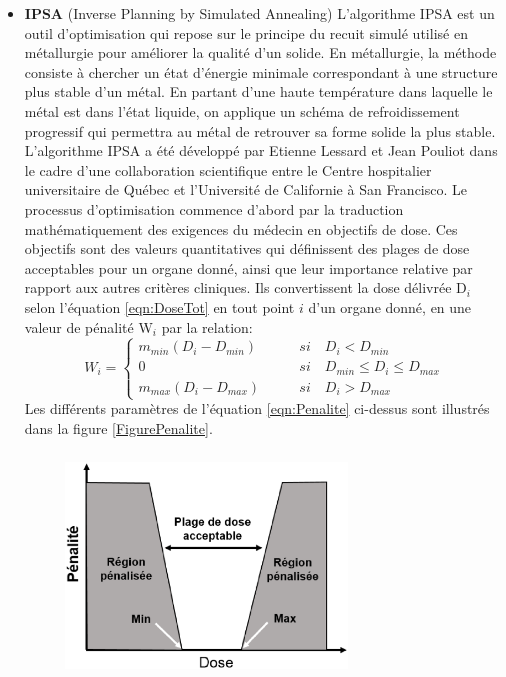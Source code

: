 \begin{itemize}[leftmargin=0pt, label=\textbullet, font=\LARGE]
\item[] \textbf{IPSA} (Inverse Planning by Simulated Annealing) \newline
L’algorithme IPSA est un outil d’optimisation qui repose sur le principe du recuit simulé utilisé en métallurgie pour améliorer la qualité d’un solide. En métallurgie, la méthode consiste à chercher un état d’énergie minimale correspondant à une structure plus stable d’un métal. En partant d’une haute température dans laquelle le métal est dans l’état liquide, on applique un schéma de refroidissement progressif qui permettra au métal de retrouver sa forme solide la plus stable. L’algorithme IPSA a été développé par Etienne Lessard et Jean Pouliot \cite{ELessard, lessard@2001} dans le cadre d’une collaboration scientifique entre le Centre hospitalier universitaire de Québec et l’Université de Californie à San Francisco. Le processus d’optimisation commence d’abord par la traduction mathématiquement des exigences du médecin en objectifs de dose. Ces objectifs sont des valeurs quantitatives qui définissent des plages de dose acceptables pour un organe donné, ainsi que leur importance relative par rapport aux autres critères cliniques. Ils convertissent la dose délivrée D$_{i}$ selon l’équation \eqref{eqn:DoseTot} en tout point $i$ d’un organe donné, en une valeur de pénalité W$_{i}$ par la relation:
%
\begin{equation}\label{eqn:Penalite}
    W_{i} = \begin{cases}
               m_{min}\left(D_{i}-D_{min}\right)               & \qquad si \quad D_{i} < D_{min} \\
               0                                               & \qquad si \quad D_{min} ≤ D_{i} ≤ D_{max} \\	
               m_{max}\left(D_{i}-D_{max}\right) 			   & \qquad si \quad D_{i} > D_{max} 
           \end{cases}
\end{equation}
%
Les différents paramètres de l'équation \eqref{eqn:Penalite} ci-dessus sont illustrés dans la figure \ref{FigurePenalite}. 
%
\begin{figure}[!ht]
\centering
\includegraphics[width=7.5cm, height=6.0cm]{FigurePenalite}

\end{figure}
\end{itemize}
